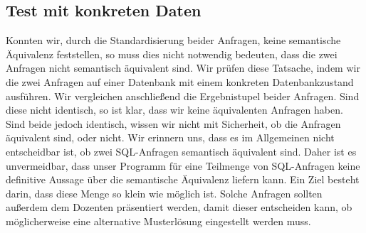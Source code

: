


\subsection{Test mit konkreten Daten}

Konnten wir, durch die Standardisierung beider Anfragen, keine semantische Äquivalenz feststellen, so muss dies nicht notwendig bedeuten, dass die zwei Anfragen nicht semantisch äquivalent sind. Wir prüfen diese Tatsache, indem wir die zwei Anfragen auf einer Datenbank mit einem konkreten Datenbankzustand ausführen. Wir vergleichen anschließend die Ergebnistupel beider Anfragen. Sind diese nicht identisch, so ist klar, dass wir keine äquivalenten Anfragen haben. Sind beide jedoch identisch, wissen wir nicht mit Sicherheit, ob die Anfragen äquivalent sind, oder nicht. Wir erinnern uns, dass es im Allgemeinen nicht entscheidbar ist, ob zwei SQL-Anfragen semantisch äquivalent sind. Daher ist es unvermeidbar, dass unser Programm für eine Teilmenge von SQL-Anfragen keine definitive Aussage über die semantische Äquivalenz liefern kann. Ein Ziel besteht darin, dass diese Menge so klein wie möglich ist. Solche Anfragen sollten außerdem dem Dozenten präsentiert werden, damit dieser entscheiden kann, ob möglicherweise eine alternative Musterlösung eingestellt werden muss.



